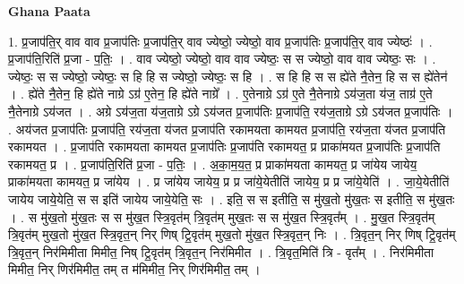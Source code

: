 \documentclass[17pt]{extarticle}
\begin{document}
\textbf{Ghana Paata } \newline

1. प्र॒जाप॑ति॒र् वाव वाव प्र॒जाप॑तिः प्र॒जाप॑ति॒र् वाव ज्येष्ठो॒ ज्येष्ठो॒ वाव प्र॒जाप॑तिः प्र॒जाप॑ति॒र् वाव ज्येष्ठः॑ । . प्र॒जाप॑ति॒रिति॑ प्र॒जा - प॒तिः॒ । . वाव ज्येष्ठो॒ ज्येष्ठो॒ वाव वाव ज्येष्ठः॒ स स ज्येष्ठो॒ वाव वाव ज्येष्ठः॒ सः । . ज्येष्ठः॒ स स ज्येष्ठो॒ ज्येष्ठः॒ स हि हि स ज्येष्ठो॒ ज्येष्ठः॒ स हि । . स हि हि स स ह्ये॑ते नै॒तेन॒ हि स स ह्ये॑तेन॑ । . ह्ये॑ते नै॒तेन॒ हि ह्ये॑ते नाग्रे ऽग्र॑ ए॒तेन॒ हि ह्ये॑ते नाग्रे᳚ । . ए॒तेनाग्रे ऽग्र॑ ए॒ते नै॒तेनाग्रे ऽय॑ज॒ता य॑ज॒ ताग्र॑ ए॒ते नै॒तेनाग्रे ऽय॑जत । . अग्रे ऽय॑ज॒ता य॑ज॒ताग्रे ऽग्रे ऽय॑जत प्र॒जाप॑तिः प्र॒जाप॑ति॒ रय॑ज॒ताग्रे ऽग्रे ऽय॑जत प्र॒जाप॑तिः । . अय॑जत प्र॒जाप॑तिः प्र॒जाप॑ति॒ रय॑ज॒ता य॑जत प्र॒जाप॑ति रकामयता कामयत प्र॒जाप॑ति॒ रय॑ज॒ता य॑जत प्र॒जाप॑ति रकामयत । . प्र॒जाप॑ति रकामयता कामयत प्र॒जाप॑तिः प्र॒जाप॑ति रकामयत॒ प्र प्राका॑मयत प्र॒जाप॑तिः प्र॒जाप॑ति रकामयत॒ प्र । . प्र॒जाप॑ति॒रिति॑ प्र॒जा - प॒तिः॒ । . अ॒का॒म॒य॒त॒ प्र प्राका॑मयता कामयत॒ प्र जा॑येय जायेय॒ प्राका॑मयता कामयत॒ प्र जा॑येय । . प्र जा॑येय जायेय॒ प्र प्र जा॑ये॒येतीति॑ जायेय॒ प्र प्र जा॑ये॒येति॑ । . जा॒ये॒येतीति॑ जायेय जाये॒येति॒ स स इति॑ जायेय जाये॒येति॒ सः । . इति॒ स स इतीति॒ स मु॑ख॒तो मु॑ख॒तः स इतीति॒ स मु॑ख॒तः । . स मु॑ख॒तो मु॑ख॒तः स स मु॑ख॒त स्त्रि॒वृत॑म् त्रि॒वृत॑म् मुख॒तः स स मु॑ख॒त स्त्रि॒वृत᳚म् । . मु॒ख॒त स्त्रि॒वृत॑म् त्रि॒वृत॑म् मुख॒तो मु॑ख॒त स्त्रि॒वृत॒न् निर् णिष् ट्रि॒वृत॑म् मुख॒तो मु॑ख॒त स्त्रि॒वृत॒न् निः । . त्रि॒वृत॒न् निर् णिष् ट्रि॒वृत॑म् त्रि॒वृत॒न् निर॑मिमीता मिमीत॒ निष् ट्रि॒वृत॑म् त्रि॒वृत॒न् निर॑मिमीत । . त्रि॒वृत॒मिति॑ त्रि - वृत᳚म् । . निर॑मिमीता मिमीत॒ निर् णिर॑मिमीत॒ तम् त म॑मिमीत॒ निर् णिर॑मिमीत॒ तम् । \newline
\end{document}
